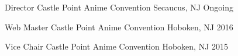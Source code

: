 

\begin{cvhonors}

  \cvhonor
    {Director} %
    {Castle Point Anime Convention} %
    {Secaucus, NJ} %
    {Ongoing} %

  \cvhonor
    {Web Master} %
    {Castle Point Anime Convention} %
    {Hoboken, NJ} %
    {2016} %

  \cvhonor
    {Vice Chair} %
    {Castle Point Anime Convention} %
    {Hoboken, NJ} %
    {2015} %

\end{cvhonors}
